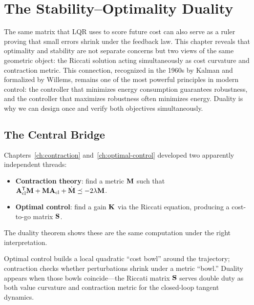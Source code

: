 \chapter{The Stability--Optimality Duality}
\label{ch:duality}

\begin{laymansbox}
The same matrix that LQR uses to score future cost can also serve as a ruler proving
that small errors shrink under the feedback law. This chapter reveals that optimality
and stability are not separate concerns but two views of the same geometric object: the
Riccati solution acting simultaneously as cost curvature and contraction metric. This
connection, recognized in the 1960s by Kalman and formalized by Willems, remains one of
the most powerful principles in modern control: the controller that minimizes energy
consumption guarantees robustness, and the controller that maximizes robustness often
minimizes energy. Duality is why we can design once and verify both objectives
simultaneously.
\end{laymansbox}

\section{The Central Bridge}

Chapters~\ref{ch:contraction} and~\ref{ch:optimal-control} developed two apparently
independent threads:
\begin{itemize}
\item \textbf{Contraction theory}: find a metric $\mathbf{M}$ such that
$\mathbf{A}_{\text{cl}}^{\mathsf{T}}\mathbf{M}+\mathbf{M}\mathbf{A}_{\text{cl}}+\dot{\mathbf{M}}
\preceq -2\lambda\mathbf{M}$.
\item \textbf{Optimal control}: find a gain $\mathbf{K}$ via the Riccati equation,
producing a cost-to-go matrix $\mathbf{S}$.
\end{itemize}

The duality theorem shows these are the same computation under the right interpretation.

\begin{intuitionbox}
Optimal control builds a local quadratic ``cost bowl'' around the trajectory; contraction
checks whether perturbations shrink under a metric ``bowl.'' Duality appears when those
bowls coincide---the Riccati matrix $\mathbf{S}$ serves double duty as both value curvature
and contraction metric for the closed-loop tangent dynamics.
\end{intuitionbox}

